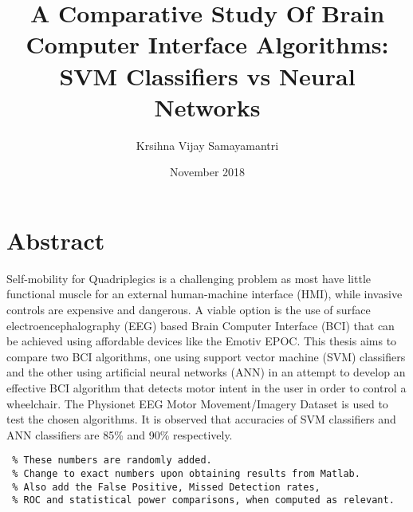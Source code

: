\documentclass{article}
\title{A Comparative Study Of Brain Computer Interface Algorithms: SVM Classifiers vs Neural Networks}
\author{Krsihna Vijay Samayamantri}
\date{November 2018}
\begin{document}
\maketitle

\section{Abstract}
Self-mobility for Quadriplegics is a challenging problem as most have little functional muscle for an external human-machine interface (HMI), while invasive controls are expensive and dangerous. A viable option is the use of surface electroencephalography (EEG) based Brain Computer Interface (BCI) that can be achieved using affordable devices like the Emotiv EPOC.
This thesis aims to compare two BCI algorithms, one using support vector machine (SVM) classifiers and the other using  artificial neural networks (ANN) in an attempt to develop an effective BCI algorithm that detects motor intent in the user in order to control a wheelchair.
The Physionet EEG Motor Movement/Imagery Dataset is used to test the chosen algorithms. It is observed that accuracies of SVM classifiers and ANN classifiers are 85\% and 90\% respectively. 
\begin{verbatim}
 % These numbers are randomly added. 
 % Change to exact numbers upon obtaining results from Matlab. 
 % Also add the False Positive, Missed Detection rates, 
 % ROC and statistical power comparisons, when computed as relevant.
\end{verbatim}
\end{document}
